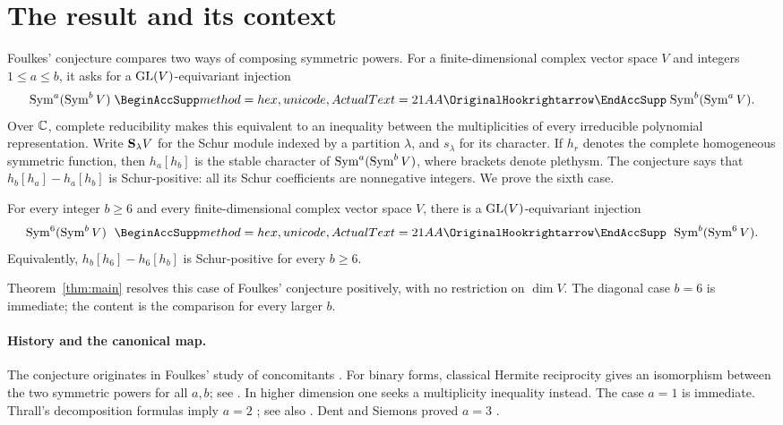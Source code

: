 \section{The result and its context}

Foulkes' conjecture compares two ways of composing symmetric powers.
For a finite-dimensional complex vector space \(V\) and integers
\(1\le a\le b\), it asks for a \(\operatorname{GL}(V)\)-equivariant injection
\[
             \Sym^a(\Sym^b V)\hookrightarrow\Sym^b(\Sym^a V).
\]
Over \(\mathbb C\), complete reducibility makes this equivalent to an
inequality between the multiplicities of every irreducible polynomial
representation. Write \(\mathbf S_\lambda V\) for the Schur module indexed
by a partition \(\lambda\), and \(s_\lambda\) for its character.
If \(h_r\) denotes the complete homogeneous symmetric function, then
\(h_a[h_b]\) is the stable character of \(\operatorname{Sym}^a(\operatorname{Sym}^b V)\), where
brackets denote plethysm. The conjecture says that
\(h_b[h_a]-h_a[h_b]\) is Schur-positive: all its Schur coefficients
are nonnegative integers. We prove the sixth case.

\begin{theorem}\label{thm:main}
For every integer \(b\ge6\) and every finite-dimensional complex vector
space \(V\), there is a \(\operatorname{GL}(V)\)-equivariant injection
\[
                 \Sym^6(\Sym^b V)\ \hookrightarrow\ \Sym^b(\Sym^6 V).
\]
Equivalently, \(h_b[h_6]-h_6[h_b]\) is Schur-positive for every \(b\ge6\).
\end{theorem}

Theorem~\ref{thm:main} resolves this case of Foulkes' conjecture
positively, with no restriction on \(\dim V\). The diagonal case
\(b=6\) is immediate; the content is the comparison for every larger
\(b\).

\paragraph{History and the canonical map.}
The conjecture originates in Foulkes' study of concomitants
\cite{Foulkes1950}. For binary forms, classical Hermite reciprocity
gives an isomorphism between the two symmetric powers for all \(a,b\);
see \cite[Introduction]{RaicuSamWeyman2022}. In higher dimension one
seeks a multiplicity inequality instead.
The case \(a=1\) is immediate. Thrall's decomposition formulas imply
\(a=2\) \cite{Thrall1942}; see also \cite[p.~237]{DentSiemons2000}.
Dent and Siemons proved \(a=3\) \cite{DentSiemons2000}.

